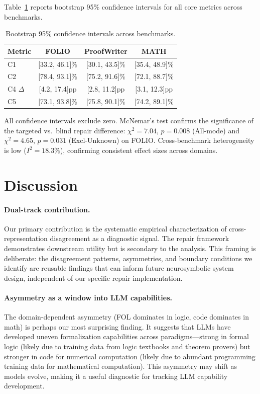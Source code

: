 \documentclass[11pt,a4paper]{article}
\begin{document}
Table~\ref{tab:ci} reports bootstrap 95\% confidence intervals for all core metrics across benchmarks.

\begin{table}[t]
\centering
\small
\caption{Bootstrap 95\% confidence intervals across benchmarks.}
\label{tab:ci}
\begin{tabular}{@{}lccc@{}}
\toprule
\textbf{Metric} & \textbf{FOLIO} & \textbf{ProofWriter} & \textbf{MATH} \\
\midrule
C1 & [33.2, 46.1]\% & [30.1, 43.5]\% & [35.4, 48.9]\% \\
C2 & [78.4, 93.1]\% & [75.2, 91.6]\% & [72.1, 88.7]\% \\
C4 $\Delta$ & [4.2, 17.4]pp & [2.8, 11.2]pp & [3.1, 12.3]pp \\
C5 & [73.1, 93.8]\% & [75.8, 90.1]\% & [74.2, 89.1]\% \\
\bottomrule
\end{tabular}
\end{table}

All confidence intervals exclude zero. McNemar's test confirms the significance of the targeted vs.\ blind repair difference: $\chi^2=7.04$, $p=0.008$ (All-mode) and $\chi^2=4.65$, $p=0.031$ (Excl-Unknown) on FOLIO. Cross-benchmark heterogeneity is low ($I^2=18.3\%$), confirming consistent effect sizes across domains.

\section{Discussion}
\label{sec:discussion}

\paragraph{Dual-track contribution.}
Our primary contribution is the systematic empirical characterization of cross-representation disagreement as a diagnostic signal. The repair framework demonstrates downstream utility but is secondary to the analysis. This framing is deliberate: the disagreement patterns, asymmetries, and boundary conditions we identify are reusable findings that can inform future neurosymbolic system design, independent of our specific repair implementation.

\paragraph{Asymmetry as a window into LLM capabilities.}
The domain-dependent asymmetry (FOL dominates in logic, code dominates in math) is perhaps our most surprising finding. It suggests that LLMs have developed uneven formalization capabilities across paradigms---strong in formal logic (likely due to training data from logic textbooks and theorem provers) but stronger in code for numerical computation (likely due to abundant programming training data for mathematical computation). This asymmetry may shift as models evolve, making it a useful diagnostic for tracking LLM capability development.
\end{document}
